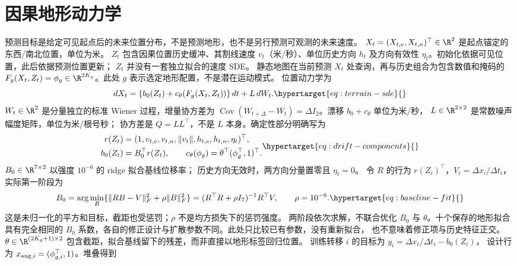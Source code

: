 \section{因果地形动力学}
预测目标是给定可见起点后的未来位置分布，不是预测地形，也不是另行预测可观测的未来速度。
\(X_t=(X_{t,e},X_{t,n})^\top\in\R^2\) 是起点锚定的东西/南北位置，单位为米。
\(Z_t\) 包含因果位置历史缓冲、其割线速度 \(v_t\)（米/秒）、单位历史方向 \(h_t\)
及方向有效性 \(\eta_t\)。初始化依据可见位置，此后依据预测位置更新；
\(Z_t\) 并没有一套独立拟合的速度 SDE。
静态地图在当前预测 \(X_t\) 处查询，再与历史组合为包含数值和掩码的
\(F_g(X_t,Z_t)=\phi_g\in\R^{2K_g}\)。此处 \(g\) 表示选定地形配置，不是潜在运动模式。
位置动力学为
\begin{equation}
dX_t=\{b_0(Z_t)+c_\theta(F_g(X_t,Z_t))\}\,dt+L\,dW_t.
\label{eq:terrain-sde}\hypertarget{eq:terrain-sde}{}
\end{equation}
\(W_t\in\R^2\) 是分量独立的标准 Wiener 过程，增量协方差为
\(\operatorname{Cov}(W_{t+\Delta}-W_t)=\Delta I_2\)。漂移 \(b_0+c_\theta\) 单位为米/秒，
\(L\in\R^{2\times2}\) 是常数噪声幅度矩阵，单位为米/根号秒；
协方差是 \(Q=LL^\top\)，不是 \(L\) 本身。确定性部分明确写为
\begin{equation}
\begin{aligned}
r(Z_t)&=(1,v_{t,e},v_{t,n},\|v_t\|,h_{t,e},h_{t,n},\eta_t)^\top,\\
b_0(Z_t)&=B_0^\top r(Z_t),\qquad
c_\theta(\phi_g)=\theta^\top(\phi_g^\top,1)^\top.
\end{aligned}
\label{eq:drift-components}\hypertarget{eq:drift-components}{}
\end{equation}
\(B_0\in\R^{7\times2}\) 以强度 \(10^{-6}\) 的 ridge 拟合基线位移率；
历史方向无效时，两方向分量置零且 \(\eta_t=0\)。
令 \(R\) 的行为 \(r(Z_i)^\top\)，\(V_i=\Delta x_i/\Delta t_i\)，实际第一阶段为
\begin{equation}
B_0=\arg\min_B\{\|RB-V\|_F^2+\rho\|B\|_F^2\}
 =(R^\top R+\rho I_7)^{-1}R^\top V,\qquad\rho=10^{-6}.
\label{eq:baseline-fit}\hypertarget{eq:baseline-fit}{}
\end{equation}
这是未归一化的平方和目标，截距也受惩罚；\(\rho\) 不是均方损失下的惩罚强度。
两阶段依次求解，不联合优化 \(B_0\) 与 \(\theta\)。十个保存的地形拟合具有完全相同的
\(B_0\) 系数，各自的修正设计与扩散参数不同。此处只比较已有参数，没有重新拟合，
也不意味着修正项与历史特征正交。
\(\theta\in\R^{(2K_g+1)\times2}\) 包含截距，拟合基线留下的残差，而非直接以地形标签回归位置。
训练转移 \(i\) 的目标为 \(y_i=\Delta x_i/\Delta t_i-b_0(Z_i)\)，
设计行为 \(x_{{\rm aug},i}=(\phi_{g,i}^\top,1)\)。堆叠得到

